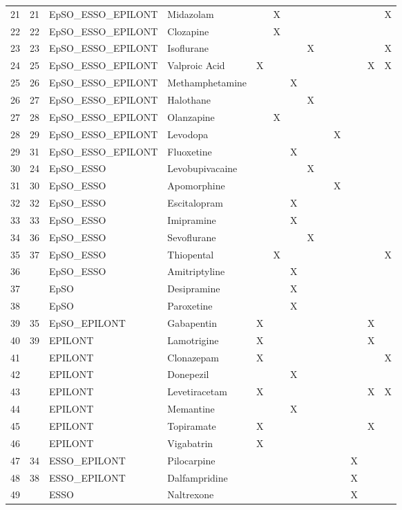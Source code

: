 \begin{table}[ht]
\begin{tabular}{rllllllllllll}
  21 & 21 & EpSO\_ESSO\_EPILONT & Midazolam &  & X &  &  &  &  &  &  & X \\ 
  22 & 22 & EpSO\_ESSO\_EPILONT & Clozapine &  & X &  &  &  &  &  &  &  \\ 
  23 & 23 & EpSO\_ESSO\_EPILONT & Isoflurane &  &  &  & X &  &  &  &  & X \\ 
  24 & 25 & EpSO\_ESSO\_EPILONT & Valproic Acid & X &  &  &  &  &  &  & X & X \\ 
  25 & 26 & EpSO\_ESSO\_EPILONT & Methamphetamine &  &  & X &  &  &  &  &  &  \\ 
  26 & 27 & EpSO\_ESSO\_EPILONT & Halothane &  &  &  & X &  &  &  &  &  \\ 
  27 & 28 & EpSO\_ESSO\_EPILONT & Olanzapine &  & X &  &  &  &  &  &  &  \\ 
  28 & 29 & EpSO\_ESSO\_EPILONT & Levodopa &  &  &  &  &  & X &  &  &  \\ 
  29 & 31 & EpSO\_ESSO\_EPILONT & Fluoxetine &  &  & X &  &  &  &  &  &  \\ 
  30 & 24 & EpSO\_ESSO & Levobupivacaine &  &  &  & X &  &  &  &  &  \\ 
  31 & 30 & EpSO\_ESSO & Apomorphine &  &  &  &  &  & X &  &  &  \\ 
  32 & 32 & EpSO\_ESSO & Escitalopram &  &  & X &  &  &  &  &  &  \\ 
  33 & 33 & EpSO\_ESSO & Imipramine &  &  & X &  &  &  &  &  &  \\ 
  34 & 36 & EpSO\_ESSO & Sevoflurane &  &  &  & X &  &  &  &  &  \\ 
  35 & 37 & EpSO\_ESSO & Thiopental &  & X &  &  &  &  &  &  & X \\ 
  36 &  & EpSO\_ESSO & Amitriptyline &  &  & X &  &  &  &  &  &  \\ 
  37 &  & EpSO & Desipramine &  &  & X &  &  &  &  &  &  \\ 
  38 &  & EpSO & Paroxetine &  &  & X &  &  &  &  &  &  \\ 
  39 & 35 & EpSO\_EPILONT & Gabapentin & X &  &  &  &  &  &  & X &  \\ 
  40 & 39 & EPILONT & Lamotrigine & X &  &  &  &  &  &  & X &  \\ 
  41 &  & EPILONT & Clonazepam & X &  &  &  &  &  &  &  & X \\ 
  42 &  & EPILONT & Donepezil &  &  & X &  &  &  &  &  &  \\ 
  43 &  & EPILONT & Levetiracetam & X &  &  &  &  &  &  & X & X \\ 
  44 &  & EPILONT & Memantine &  &  & X &  &  &  &  &  &  \\ 
  45 &  & EPILONT & Topiramate & X &  &  &  &  &  &  & X &  \\ 
  46 &  & EPILONT & Vigabatrin & X &  &  &  &  &  &  &  &  \\ 
  47 & 34 & ESSO\_EPILONT & Pilocarpine &  &  &  &  &  &  & X &  &  \\ 
  48 & 38 & ESSO\_EPILONT & Dalfampridine &  &  &  &  &  &  & X &  &  \\ 
  49 &  & ESSO & Naltrexone &  &  &  &  &  &  & X &  &  \\ 
   \hline
\end{tabular}
\end{table}
